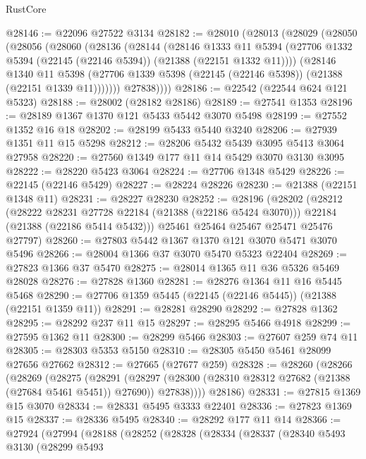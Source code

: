 \begin{lexlean}{RustCore}
\begin{coremodule}
@28146 := @22096 @27522 @3134
@28182 := @28010
    (@28013
      (@28029
        (@28050
          (@28056
            (@28060
              (@28136
                (@28144
                  (@28146
                    @1333
                    @11
                    @5394
                    (@27706 @1332 @5394 (@22145 (@22146 @5394)) (@21388 (@22151 @1332 @11))))
                  (@28146
                    @1340
                    @11
                    @5398
                    (@27706 @1339 @5398 (@22145 (@22146 @5398)) (@21388 (@22151 @1339 @11)))))))
            @27838))))
@28186 := @22542 (@22544 @624 @121 @5323)
@28188 := @28002 (@28182 @28186)
@28189 := @27541 @1353
@28196 := @28189 @1367 @1370 @121 @5433 @5442 @3070 @5498
@28199 := @27552 @1352 @16 @18
@28202 := @28199 @5433 @5440 @3240
@28206 := @27939 @1351 @11 @15 @5298
@28212 := @28206 @5432 @5439 @3095 @5413 @3064 @27958
@28220 := @27560 @1349 @177 @11 @14 @5429 @3070 @3130 @3095
@28222 := @28220 @5423 @3064
@28224 := @27706 @1348 @5429
@28226 := @22145 (@22146 @5429)
@28227 := @28224 @28226
@28230 := @21388 (@22151 @1348 @11)
@28231 := @28227 @28230
@28252 := @28196
    (@28202
      (@28212
        (@28222 @28231 @27728 @22184 (@21388 (@22186 @5424 @3070)))
        @22184
        (@21388 (@22186 @5414 @5432)))
      @25461
      @25464
      @25467
      @25471
      @25476
      @27797)
@28260 := @27803 @5442 @1367 @1370 @121 @3070 @5471 @3070 @5496
@28266 := @28004 @1366 @37 @3070 @5470 @5323 @22404
@28269 := @27823 @1366 @37 @5470
@28275 := @28014 @1365 @11 @36 @5326 @5469 @28028
@28276 := @27828 @1360
@28281 := @28276 @1364 @11 @16 @5445 @5468
@28290 := @27706 @1359 @5445 (@22145 (@22146 @5445)) (@21388 (@22151 @1359 @11))
@28291 := @28281 @28290
@28292 := @27828 @1362
@28295 := @28292 @237 @11 @15
@28297 := @28295 @5466 @4918
@28299 := @27595 @1362 @11
@28300 := @28299 @5466
@28303 := @27607 @259 @74 @11
@28305 := @28303 @5353 @5150
@28310 := @28305 @5450 @5461 @28099 @27656 @27662
@28312 := @27665 (@27677 @259)
@28328 := @28260
    (@28266
      (@28269
        (@28275
          (@28291
            (@28297 (@28300 (@28310 @28312 @27682 (@21388 (@27684 @5461 @5451)) @27690)) @27838))))
      @28186)
@28331 := @27815 @1369 @15 @3070
@28334 := @28331 @5495 @3333 @22401
@28336 := @27823 @1369 @15
@28337 := @28336 @5495
@28340 := @28292 @177 @11 @14
@28366 := @27924
    (@27994
      (@28188
        (@28252
          (@28328
            (@28334
              (@28337
                (@28340
                  @5493
                  @3130
                  (@28299
                    @5493

\end{coremodule}
\end{lexlean}
